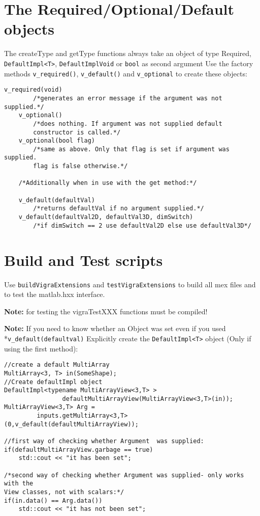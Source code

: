 \documentclass[a4paper,10pt]{article}
\begin{document}
\section{The Required/Optional/Default objects}
The createType and getType functions always take an object of type Required, 
\verb+DefaultImpl<T>+,  \verb+DefaultImplVoid+ or \verb+bool+ as second argument 
Use the factory methods \verb+v_required()+, \verb+v_default()+ and 
\verb+v_optional+ to create these objects:

\begin{lstlisting}[caption={Behavior of the get/set functions with the factory objects}]
	v_required(void)
		/*generates an error message if the argument was not supplied.*/
	v_optional()
		/*does nothing. If argument was not supplied default 
		constructor is called.*/
	v_optional(bool flag)
		/*same as above. Only that flag is set if argument was supplied. 
		flag is false otherwise.*/
	
	/*Additionally when in use with the get method:*/
	
	v_default(defaultVal)
		/*returns defaultVal if no argument supplied.*/
	v_default(defaultVal2D, defaultVal3D, dimSwitch)
		/*if dimSwitch == 2 use defaultVal2D else use defaultVal3D*/
\end{lstlisting}
\section{Build and Test scripts}
Use \verb+buildVigraExtensions+ and \verb+testVigraExtensions+ to build all mex files and to test the 
matlab.hxx interface.

\textbf{Note:} for testing the vigraTestXXX functions must be compiled!

\textbf{Note:} 	If you need to know whether an Object was set even if you used \\*\verb+v_default(defaultval)+
	Explicitly create the \verb+DefaultImpl<T>+ object (Only if using the first method):

\begin{lstlisting}[caption={Finding out whether a default object was set}]	
//create a default MultiArray
MultiArray<3, T> in(SomeShape);
//Create defaultImpl object
DefaultImpl<typename MultiArrayView<3,T> > 
				defaultMultiArrayView(MultiArrayView<3,T>(in));
MultiArrayView<3,T> Arg = 
		 inputs.getMultiArray<3,T>(0,v_default(defaultMultiArrayView));

//first way of checking whether Argument  was supplied:
if(defaultMultiArrayView.garbage == true) 
	std::cout << "it has been set";

/*second way of checking whether Argument was supplied- only works with the 
View classes, not with scalars:*/
if(in.data() == Arg.data()) 
	std::cout << "it has not been set";
\end{lstlisting}
\end{document}
